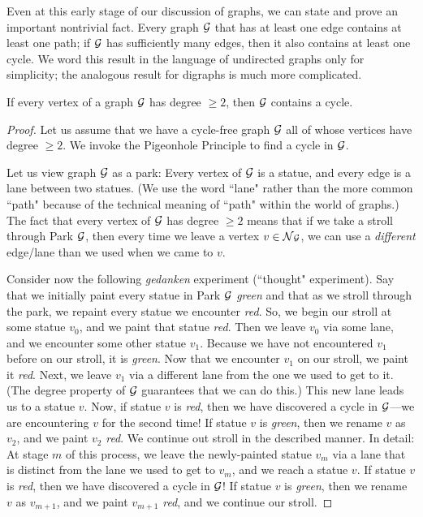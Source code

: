\bigskip

Even at this early stage of our discussion of graphs, we can state and prove an important
nontrivial fact.  Every graph $\mbox{$\cal G$}$ that has at least one edge contains at least one path; if $\mbox{$\cal G$}$ has sufficiently many edges, then it also contains at least one cycle.  We word this result in the language of undirected graphs only for simplicity; the analogous result for digraphs is much more complicated.

\begin{prop}
\label{thm:cycle-in-graph}
If every vertex of a graph $\mbox{$\cal G$}$ has degree $\geq 2$, then $\mbox{$\cal G$}$ contains a cycle.
\end{prop}

\begin{proof}
Let us assume that we have a cycle-free graph $\mbox{$\cal G$}$ all of whose vertices have degree $\geq 2$.  We invoke the Pigeonhole Principle to find a cycle in $\mbox{$\cal G$}$.

\smallskip

Let us view graph $\mbox{$\cal G$}$ as a park:  Every vertex of $\mbox{$\cal G$}$ is a statue, and every edge is a lane between two statues.  (We use the word ``lane" rather than the more common ``path"  because of the technical meaning of ``path" within the world of graphs.)   The fact that every vertex of $\mbox{$\cal G$}$ has degree $\geq 2$ means that if we take a stroll through Park $\mbox{$\cal G$}$, then every time we leave a vertex $v \in \mbox{$\cal N$}{\mbox{{\scriptsize $\cal G$}}}$, we can use a {\em different} edge/lane than we used when we came to $v$.

\smallskip


Consider now the following {\em gedanken} experiment (``thought" experiment).  Say that we initially paint every statue in Park $\mbox{$\cal G$}$ {\em green} and that as we stroll through the park, we repaint every statue we encounter {\em red}.  So, we begin our stroll at some statue $v_0$, and we paint that statue {\em red}.  Then we  leave $v_0$ via some lane, and we encounter some other statue $v_1$.  Because we have not encountered $v_1$ before on our stroll, it is {\em green}.  Now that we encounter $v_1$ on our stroll, we paint it {\em red}.  Next, we leave $v_1$ via a different lane from the one we used to get to it.  (The degree property of $\mbox{$\cal G$}$ guarantees that we can do this.)  This new lane leads us to a statue $v$.  Now, if statue $v$ is {\em red}, then we have discovered a cycle in $\mbox{$\cal G$}$---we are encountering $v$ for the second time!  If statue $v$ is {\em green}, then we rename $v$ as $v_2$, and we paint $v_2$ {\em red}.  We continue out stroll in the described manner.  In detail: At stage $m$ of this process, we leave the 
newly-painted statue $v_m$ via a lane that is distinct from the lane we used to get to $v_m$, 
and we reach a statue $v$.  If statue $v$ is {\em red}, then we have discovered a cycle in $\mbox{$\cal G$}$!
If statue $v$ is {\em green}, then we rename $v$ as $v_{m+1}$, and we paint $v_{m+1}$ {\em red}, and we continue our stroll.


\end{proof}
